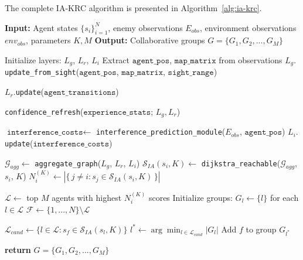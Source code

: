 The complete IA-KRC algorithm is presented in Algorithm~\ref{alg:ia-krc}.

\begin{algorithm}[H]
\caption{IA-KRC Algorithm}
\label{alg:ia-krc}
\begin{algorithmic}[1]
\STATE \textbf{Input:} Agent states $\{s_i\}_{i=1}^N$, enemy observations $E_{obs}$, environment observations $env_{obs}$, parameters $K, M$
\STATE \textbf{Output:} Collaborative groups $G = \{G_1, G_2, ..., G_{M}\}$

\STATE {}
\STATE Initialize layers: $L_g$, $L_r$, $L_i$
\STATE Extract $\texttt{agent\_pos}$, $\texttt{map\_matrix}$ from observations
\STATE $L_g.$\texttt{update\_from\_sight}($\texttt{agent\_pos}$, $\texttt{map\_matrix}$, $\texttt{sight\_range}$) 

\STATE $L_r.$\texttt{update}($\texttt{agent\_transitions}$) 

\STATE \texttt{confidence\_refresh}($\texttt{experience\_stats}$; $L_g, L_r$)


\STATE {}
    \STATE $\texttt{interference\_costs} \leftarrow$ \texttt{interference\_prediction\_module}($E_{obs}$, $\texttt{agent\_pos}$)
    \STATE $L_i.$\texttt{update}($\texttt{interference\_costs}$)
\ENDIF

\STATE {}
\STATE $\mathcal{G}_{agg} \leftarrow$ \texttt{aggregate\_graph}($L_g$, $L_r$, $L_i$)
    \STATE $\mathcal{S}_{IA}(s_i, K) \leftarrow$ \texttt{dijkstra\_reachable}($\mathcal{G}_{agg}$, $s_i$, $K$)
    \STATE $N_i^{(K)} \leftarrow \left|\{\, j \ne i : s_j \in \mathcal{S}_{IA}(s_i, K) \,\}\right|$
\ENDFOR

\STATE {}
\STATE $\mathcal{L} \leftarrow$ top $M$ agents with highest $N_i^{(K)}$ scores
\STATE Initialize groups: $G_l \leftarrow \{l\}$ for each $l \in \mathcal{L}$
\STATE $\mathcal{F} \leftarrow \{1, ..., N\} \setminus \mathcal{L}$

    \STATE $\mathcal{L}_{cand} \leftarrow \{l \in \mathcal{L} : s_f \in \mathcal{S}_{IA}(s_l, K)\}$
        \STATE $l^* \leftarrow \arg\min_{l \in \mathcal{L}_{cand}} |G_l|$
        \STATE Add $f$ to group $G_{l^*}$
    \ENDIF
\ENDFOR

\STATE \textbf{return} $G = \{G_1, G_2, ..., G_{M}\}$
\end{algorithmic}
\end{algorithm}

